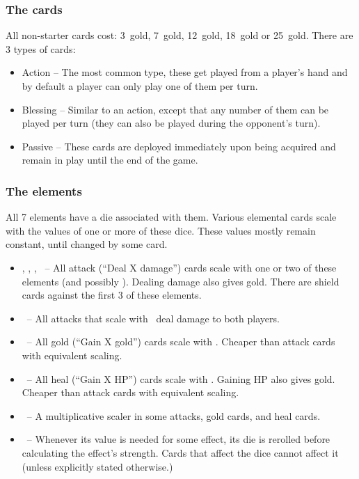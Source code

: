 \documentclass[dvipsnames,parskip,a4paper]{scrartcl}
\newcommand{\iconsize}{3.4mm}
\newcommand{\icondepth}{0.45mm}
\newcommand{\icon}[1]{\raisebox{-\icondepth}{\texttt{[image:  \#1 ]}}}
\newcommand{\fire}{\icon{icons/fire.png}}
\newcommand{\earth}{\icon{icons/earth.png}}
\newcommand{\water}{\icon{icons/water.png}}
\newcommand{\nature}{\icon{icons/nature.png}}
\newcommand{\magic}{\icon{icons/magic.png}}
\newcommand{\gold}{\icon{icons/gold.png}}
\newcommand{\chance}{\icon{icons/chance.png}}
\newcommand{\onecost}{3}
\newcommand{\twocost}{7}
\newcommand{\threecost}{12}
\newcommand{\fourcost}{18}
\newcommand{\fivecost}{25}
\begin{document}
\subsubsection*{The cards}

All non-starter cards cost: \onecost \ gold, \twocost \ gold, \threecost \ gold, \fourcost \ gold or \fivecost \ gold. There are 3 types of cards:

\begin{itemize}
\item Action -- The most common type, these get played from a player's hand and by default a player can only play one of them per turn.
\item Blessing -- Similar to an action, except that any number of them can be played per turn (they can also be played during the opponent's turn).
\item Passive -- These cards are deployed immediately upon being acquired and remain in play until the end of the game.
\end{itemize}

\subsubsection*{The elements}

All 7 elements have a die associated with them. Various elemental cards scale with the values of one or more of these dice. These values mostly remain constant, until changed by some card.

\begin{itemize}
\item \fire, \earth, \water, \chance \ -- All attack (``Deal X damage'') cards scale with one or two of these elements (and possibly \magic). Dealing damage also gives gold. There are shield cards against the first 3 of these elements.
\item \water \ -- All attacks that scale with \water \ deal damage to both players.
\item \gold \ -- All gold (``Gain X gold'') cards scale with \gold. Cheaper than attack cards with equivalent scaling.
\item \nature \ -- All heal (``Gain X HP'') cards scale with \nature. Gaining HP also gives gold. Cheaper than attack cards with equivalent scaling.
\item \magic \ -- A multiplicative scaler in some attacks, gold cards, and heal cards.
\item \chance \ -- Whenever its value is needed for some effect, its die is rerolled before calculating the effect's strength. Cards that affect the dice cannot affect it (unless explicitly stated otherwise.)
\end{itemize}
\end{document}
